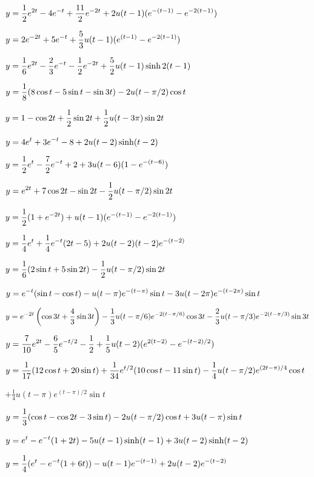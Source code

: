 \medskip

$y=\displaystyle{\frac{1}{2}e^{2t}-4e^{-t}+\frac{11}{2}e^{-2t}+2u(t-1)(e^{-(t-1)}-e^{-2(t-1)})}$

$\displaystyle{y=2e^{-2t}+5e^{-t}+\frac{5}{3}u(t-1)(e^{(t-1)}-e^{-2(t-1)})}$

$\displaystyle{y=\frac{1}{6}e^{2t}-\frac{2}{3}e^{-t}-\frac{1}{2}e^{-2t}+\frac{5}{2}u(t-1)\sinh2(t-1)}$

$\displaystyle{y=\frac{1}{8}(8\cos t-5\sin t-\sin3t)-2u(t-\pi/2)\cos t}$

$\displaystyle{y=1-\cos2t+\frac{1}{2}\sin2t+\frac{1}{2}u(t-3\pi)\sin2t}$

$\displaystyle{y=4e^{t}+3e^{-t}-8+2u(t-2)\sinh(t-2)}$

$\displaystyle{y=\frac{1}{2}e^{t}-\frac{7}{2}e^{-t}+2+3u(t-6)(1-e^{-(t-6)})}$

$\displaystyle{y=e^{2t}+7\cos2t-\sin2t-\frac{1}{2}u(t-\pi/2)\sin2t}$

$\displaystyle{y=\frac{1}{2}(1+e^{-2t})+u(t-1)(e^{-(t-1)}-e^{-2(t-1)})}$

$\displaystyle{y=\frac{1}{4}e^{t}+\frac{1}{4}e^{-t}(2t-5)+2u(t-2)(t-2)e^{-(t-2)}}$

$\displaystyle{y=\frac{1}{6}(2\sin t+5\sin2t)-\frac{1}{2}u(t-\pi/2)\sin2t}$

$\displaystyle{y=e^{-t}(\sin t-\cos t)-u(t-\pi)e^{-(t-\pi)}\sin t-3u(t-2\pi)e^{-(t-2\pi)}\sin t}$

$\displaystyle{y=e^{-2t}\left(\cos3t+\frac{4}{3}\sin3t\right)-\frac{1}{3}
u(t-\pi/6)e^{-2(t-\pi/6)}\cos3t-\frac{2}{3}u(t-\pi/3)e^{-2(t-\pi/3)}\sin3t}$

$\displaystyle{y=\frac{7}{10}e^{2t}-\frac{6}{5}e^{-t/2}-\frac{1}{2}+\frac{1}{5}u(t-2)}
(e^{2(t-2)}-e^{-(t-2)/2})$

$\displaystyle{y=\frac{1}{17}(12\cos t+20\sin t)+\frac{1}{34}e^{t/2}(10\cos t-11\sin t)
-\frac{1}{4}u(t-\pi/2)e^{(2t-\pi)/4}\cos t}$

\hspace{.9in} $+\frac{1}{4}u(t-\pi)e^{(t-\pi)/2}\sin t$

$\displaystyle{y=\frac{1}{3}(\cos t-\cos2t-3\sin t)-2u(t-\pi/2)\cos t+3u(t-\pi)\sin
t}$

$\displaystyle{y=e^{t}-e^{-t}(1+2t)-5u(t-1)\sinh(t-1)+3u(t-2)\sinh(t-2)}$

$\displaystyle{y=\frac{1}{4}(e^{t}-e^{-t}(1+6t))-u(t-1)e^{-(t-1)}+2u(t-2)e^{-(t-2)}}$

